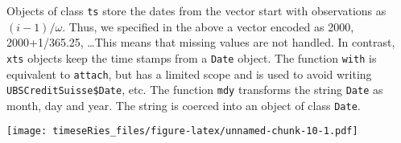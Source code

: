 \documentclass[]{book}
\newenvironment{Shaded}{\begin{snugshade}}{\end{snugshade}}
\newcommand{\KeywordTok}[1]{\textcolor[rgb]{0.13,0.29,0.53}{\textbf{#1}}}
\newcommand{\DataTypeTok}[1]{\textcolor[rgb]{0.13,0.29,0.53}{#1}}
\newcommand{\DecValTok}[1]{\textcolor[rgb]{0.00,0.00,0.81}{#1}}
\newcommand{\StringTok}[1]{\textcolor[rgb]{0.31,0.60,0.02}{#1}}
\newcommand{\CommentTok}[1]{\textcolor[rgb]{0.56,0.35,0.01}{\textit{#1}}}
\newcommand{\OperatorTok}[1]{\textcolor[rgb]{0.81,0.36,0.00}{\textbf{#1}}}
\newcommand{\NormalTok}[1]{#1}
\begin{document}
Objects of class \texttt{ts} store the dates from the vector start with
observations as \((i-1)/\omega\). Thus, we specified in the above a
vector encoded as 2000, 2000+1/365.25, \ldots This means that missing
values are not handled. In contrast, \texttt{xts} objects keep the time
stamps from a \texttt{Date} object. The function \texttt{with} is
equivalent to \texttt{attach}, but has a limited scope and is used to
avoid writing \texttt{UBSCreditSuisse\$Date}, etc. The function
\texttt{mdy} transforms the string \texttt{Date} as month, day and year.
The string is coerced into an object of class \texttt{Date}.

\begin{Shaded}
\end{Shaded}

\texttt{[image: timeseRies\_files/figure-latex/unnamed-chunk-10-1.pdf]}
\end{document}
